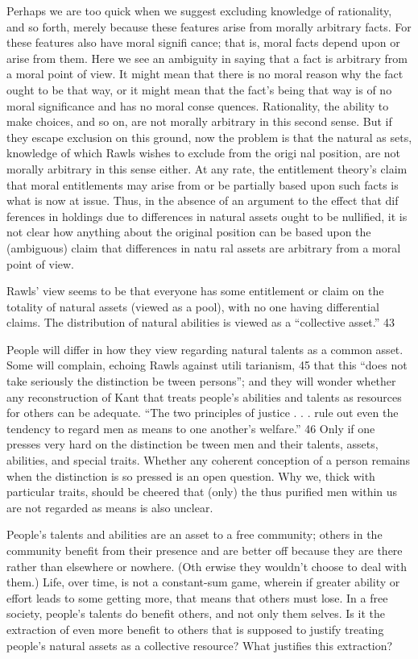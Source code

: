 \documentclass[11pt,openany]{book}
\begin{document}
Perhaps we are too quick when we suggest excluding knowledge of rationality, and so forth, merely because these features arise from morally arbitrary facts. For these features also have moral signifi cance; that is, moral facts depend upon or arise from them. Here we see an ambiguity in saying that a fact is arbitrary from a moral point of view. It might mean that there is no moral reason why the fact ought to be that way, or it might mean that the fact's being that way is of no moral significance and has no moral conse quences. Rationality, the ability to make choices, and so on, are not morally arbitrary in this second sense. But if they escape exclusion on this ground, now the problem is that the natural as sets, knowledge of which Rawls wishes to exclude from the origi nal position, are not morally arbitrary in this sense either. At any rate, the entitlement theory's claim that moral entitlements may arise from or be partially based upon such facts is what is now at issue. Thus, in the absence of an argument to the effect that dif ferences in holdings due to differences in natural assets ought to be nullified, it is not clear how anything about the original position can be based upon the (ambiguous) claim that differences in natu ral assets are arbitrary from a moral point of view. 

Rawls' view seems to be that everyone has some entitlement or claim on the totality of natural assets (viewed as a pool), with no one having differential claims. The distribution of natural abilities is viewed as a ``collective asset.'' 43 

People will differ in how they view regarding natural talents as a common asset. Some will complain, echoing Rawls against utili tarianism, 45 that this ``does not take seriously the distinction be tween persons''; and they will wonder whether any reconstruction of Kant that treats people's abilities and talents as resources for others can be adequate. ``The two principles of justice . . . rule out even the tendency to regard men as means to one another's welfare.'' 46 Only if one presses very hard on the distinction be tween men and their talents, assets, abilities, and special traits. Whether any coherent conception of a person remains when the distinction is so pressed is an open question. Why we, thick with particular traits, should be cheered that (only) the thus purified men within us are not regarded as means is also unclear. 

People's talents and abilities are an asset to a free community; others in the community benefit from their presence and are better off because they are there rather than elsewhere or nowhere. (Oth erwise they wouldn't choose to deal with them.) Life, over time, is not a constant-sum game, wherein if greater ability or effort leads to some getting more, that means that others must lose. In a free society, people's talents do benefit others, and not only them selves. Is it the extraction of even more benefit to others that is supposed to justify treating people's natural assets as a collective resource? What justifies this extraction? 
\end{document}
